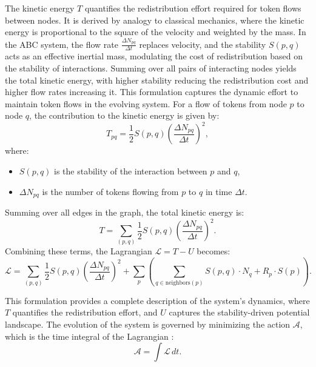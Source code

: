 \documentclass[entropy,article,submit,pdftex,oneauthor]{Definitions/mdpi}
\begin{document}
The kinetic energy \( T \) quantifies the redistribution effort required for token flows between nodes. It is derived by analogy to classical mechanics, where the kinetic energy is proportional to the square of the velocity and weighted by the mass. In the ABC system, the flow rate \( \frac{\Delta N_{pq}}{\Delta t} \) replaces velocity, and the stability \( S(p, q) \) acts as an effective inertial mass, modulating the cost of redistribution based on the stability of interactions. Summing over all pairs of interacting nodes yields the total kinetic energy, with higher stability reducing the redistribution cost and higher flow rates increasing it. This formulation captures the dynamic effort to maintain token flows in the evolving system. For a flow of tokens from node \( p \) to node \( q \), the contribution to the kinetic energy is given by:
\begin{equation}
T_{pq} = \frac{1}{2} S(p, q) \left( \frac{\Delta N_{pq}}{\Delta t} \right)^2,
\end{equation}
where:
\begin{itemize}
    \item[] \( S(p, q) \) is the stability of the interaction between \( p \) and \( q \),
    \item[] \( \Delta N_{pq} \) is the number of tokens flowing from \( p \) to \( q \) in time \( \Delta t \).
\end{itemize}
Summing over all edges in the graph, the total kinetic energy is:
\begin{equation}
T = \sum_{(p, q)} \frac{1}{2} S(p, q) \left( \frac{\Delta N_{pq}}{\Delta t} \right)^2.
\end{equation}
Combining these terms, the Lagrangian \(\mathcal{L} = T - U \) becomes:
\begin{equation}
\mathcal{L} = \sum_{(p, q)} \frac{1}{2} S(p, q) \left( \frac{\Delta N_{pq}}{\Delta t} \right)^2 + \sum_{p} \left( \sum_{q \in \text{neighbors}(p)} S(p, q) \cdot N_q + R_p \cdot S(p) \right).
\label{eq:lagrange}
\end{equation}

This formulation provides a complete description of the system's dynamics, where \( T \) quantifies the redistribution effort, and \( U \) captures the stability-driven potential landscape. The evolution of the system is governed by minimizing the action \( \mathcal{A} \), which is the time integral of the Lagrangian \cite{goldstein2002classical}: 
\begin{equation}
\mathcal{A} = \int \mathcal{L} \, dt.
\label{eq:action}
\end{equation}
\end{document}
